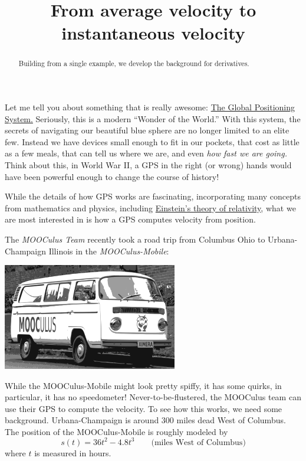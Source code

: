 \documentclass{ximera}
\title[Break-Ground:]{From average velocity to instantaneous velocity}
\begin{document}
\begin{abstract}
Building from a single example, we develop the background for
derivatives.
\end{abstract}
\maketitle



Let me tell you about something that is really awesome:
\href{http://en.wikipedia.org/wiki/Global_Positioning_System}{The
  Global Positioning System.} 
  Seriously, this is a modern ``Wonder of
the World.'' With this system, the secrets of navigating our beautiful
blue sphere are no longer limited to an elite few. Instead we have
devices small enough to fit in our pockets, that cost as little as a
few meals, that can tell us where we are, and even \textit{how fast we
  are going.} Think about this, in World War II, a GPS in the right
(or wrong) hands would have been powerful enough to change the course
of history!

While the details of how GPS works are fascinating, incorporating many
concepts from mathematics and physics, including
\href{relativisticEffectsInTheGlobalPositioningSystem.pdf}{Einstein's
  theory of relativity}, what we are most interested in is how a GPS
computes velocity from position.

The \textit{MOOCulus Team} recently took a road trip from Columbus
Ohio to Urbana-Champaign Illinois in the \textit{MOOCulus-Mobile}:
\begin{image}
\includegraphics[width=3in]{mooculusMobile.pdf} %
\end{image}
While the MOOCulus-Mobile might look pretty spiffy, it has some
quirks, in particular, it has no speedometer!  Never-to-be-flustered,
the MOOCulus team can use their GPS to compute the velocity. To see
how this works, we need some background. Urbana-Champaign is around
$300$ miles dead West of Columbus. The position of the MOOCulus-Mobile
is roughly modeled by
\[
s(t) = 36t^2 -4.8t^3 \qquad\text{(miles West of Columbus)} %
\]
where $t$ is measured in hours. 
\end{document}
